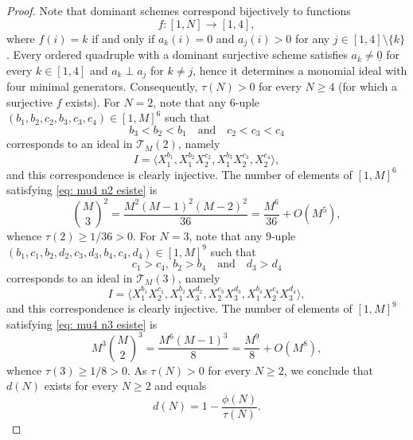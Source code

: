 \documentclass[a4paper,10pt,reqno]{amsart}
\theoremstyle{definition}
\theoremstyle{definition}
\begin{document}
\begin{proof}
    Note that dominant schemes correspond bijectively to functions
    \[ f\colon [1,N]\to [1,4], \]
    where $f(i)=k$ if and only if $a_k(i)=0$ and $a_j(i)>0$ for any $j\in [1,4]\setminus\{k\}$. Every ordered quadruple with a dominant surjective scheme satisfies $a_k\neq \underline 0$ for every $k\in [1,4]$ and $a_k\perp a_j$ for $k\neq j$, hence it determines a monomial ideal with four minimal generators. Consequently, $\tau(N)>0$ for every $N\ge 4$ (for which a surjective $f$ exists). For $N=2$, note that any $6$-uple $(b_1,b_2,c_2,b_3,c_3,c_4)\in [1,M]^6$ such that
    \begin{equation}\label{eq: mu4 n2 esiste}
        b_3<b_2<b_1 \quad\text{and}\quad c_2<c_3<c_4
    \end{equation}
    corresponds to an ideal in $\mathcal T_M(2)$, namely
    \[ I=\langle X_1^{b_1},X_1^{b_2}X_2^{c_2},X_1^{b_3}X_2^{c_3},X_2^{c_4}\rangle,\]
    and this correspondence is clearly injective. The number of elements of $[1,M]^6$ satisfying \eqref{eq: mu4 n2 esiste} is
    \[ \binom{M}{3}^2 = \frac{M^2(M-1)^2(M-2)^2}{36} = \frac{M^6}{36}+O(M^5),\]
    whence $\tau(2)\ge 1/36>0$. For $N=3$, note that any $9$-uple $(b_1,c_1,b_2,d_2,c_3,d_3,b_4,c_4,d_4)\in [1,M]^9$ such that
    \begin{equation}\label{eq: mu4 n3 esiste}
        c_1>c_4,\ b_2>b_4 \quad\text{and}\quad d_3>d_4
    \end{equation}
    corresponds to an ideal in $\mathcal T_M(3)$, namely
    \[ I=\langle X_1^{b_1}X_2^{c_1},X_1^{b_2}X_3^{d_2},X_2^{c_3}X_3^{d_3},X_1^{b_4}X_2^{c_4}X_3^{d_4}\rangle,\]
    and this correspondence is clearly injective. The number of elements of $[1,M]^9$ satisfying \eqref{eq: mu4 n3 esiste} is
    \[ M^3\binom{M}{2}^3 = \frac{M^6(M-1)^3}{8} = \frac{M^9}{8}+O(M^8), \]
    whence $\tau(3)\ge 1/8>0$. As $\tau(N)>0$ for every $N\ge 2$, we conclude that $d(N)$ exists for every $N\ge 2$ and equals \[ d(N)=1-\frac{\phi(N)}{\tau(N)}. \]
    

\end{proof}
\end{document}

